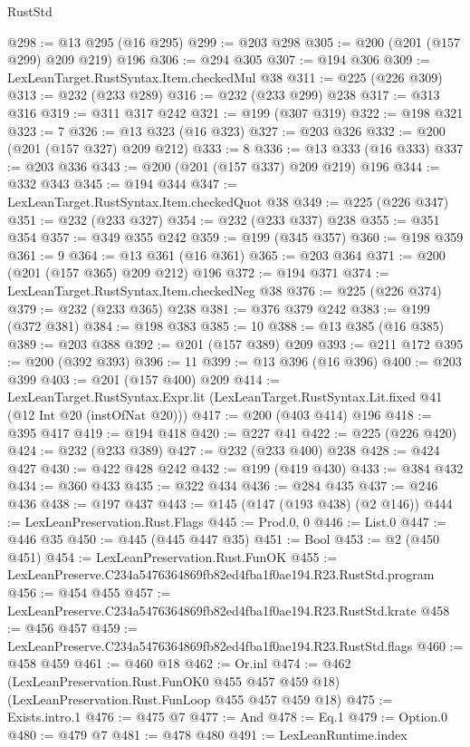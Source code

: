 \begin{lexlean}{RustStd}
\begin{coremodule}
@298 := @13 @295 (@16 @295)
@299 := @203 @298
@305 := @200 (@201 (@157 @299) @209 @219) @196
@306 := @294 @305
@307 := @194 @306
@309 := LexLeanTarget.RustSyntax.Item.checkedMul @38
@311 := @225 (@226 @309)
@313 := @232 (@233 @289)
@316 := @232 (@233 @299) @238
@317 := @313 @316
@319 := @311 @317 @242
@321 := @199 (@307 @319)
@322 := @198 @321
@323 := 7
@326 := @13 @323 (@16 @323)
@327 := @203 @326
@332 := @200 (@201 (@157 @327) @209 @212)
@333 := 8
@336 := @13 @333 (@16 @333)
@337 := @203 @336
@343 := @200 (@201 (@157 @337) @209 @219) @196
@344 := @332 @343
@345 := @194 @344
@347 := LexLeanTarget.RustSyntax.Item.checkedQuot @38
@349 := @225 (@226 @347)
@351 := @232 (@233 @327)
@354 := @232 (@233 @337) @238
@355 := @351 @354
@357 := @349 @355 @242
@359 := @199 (@345 @357)
@360 := @198 @359
@361 := 9
@364 := @13 @361 (@16 @361)
@365 := @203 @364
@371 := @200 (@201 (@157 @365) @209 @212) @196
@372 := @194 @371
@374 := LexLeanTarget.RustSyntax.Item.checkedNeg @38
@376 := @225 (@226 @374)
@379 := @232 (@233 @365) @238
@381 := @376 @379 @242
@383 := @199 (@372 @381)
@384 := @198 @383
@385 := 10
@388 := @13 @385 (@16 @385)
@389 := @203 @388
@392 := @201 (@157 @389) @209
@393 := @211 @172
@395 := @200 (@392 @393)
@396 := 11
@399 := @13 @396 (@16 @396)
@400 := @203 @399
@403 := @201 (@157 @400) @209
@414 := LexLeanTarget.RustSyntax.Expr.lit
    (LexLeanTarget.RustSyntax.Lit.fixed @41 (@12 Int @20 (instOfNat @20)))
@417 := @200 (@403 @414) @196
@418 := @395 @417
@419 := @194 @418
@420 := @227 @41
@422 := @225 (@226 @420)
@424 := @232 (@233 @389)
@427 := @232 (@233 @400) @238
@428 := @424 @427
@430 := @422 @428 @242
@432 := @199 (@419 @430)
@433 := @384 @432
@434 := @360 @433
@435 := @322 @434
@436 := @284 @435
@437 := @246 @436
@438 := @197 @437
@443 := @145 (@147 (@193 @438) (@2 @146))
@444 := LexLeanPreservation.Rust.Flags
@445 := Prod.{0, 0}
@446 := List.{0}
@447 := @446 @35
@450 := @445 (@445 @447 @35)
@451 := Bool
@453 := @2 (@450 @451)
@454 := LexLeanPreservation.Rust.FunOK
@455 := LexLeanPreserve.C234a5476364869fb82ed4fba1f0ae194.R23.RustStd.program
@456 := @454 @455
@457 := LexLeanPreserve.C234a5476364869fb82ed4fba1f0ae194.R23.RustStd.krate
@458 := @456 @457
@459 := LexLeanPreserve.C234a5476364869fb82ed4fba1f0ae194.R23.RustStd.flags
@460 := @458 @459
@461 := @460 @18
@462 := Or.inl
@474 := @462
    (LexLeanPreservation.Rust.FunOK0 @455 @457 @459 @18)
    (LexLeanPreservation.Rust.FunLoop @455 @457 @459 @18)
@475 := Exists.intro.{1}
@476 := @475 @7
@477 := And
@478 := Eq.{1}
@479 := Option.{0}
@480 := @479 @7
@481 := @478 @480
@491 := LexLeanRuntime.index

\end{coremodule}
\end{lexlean}
